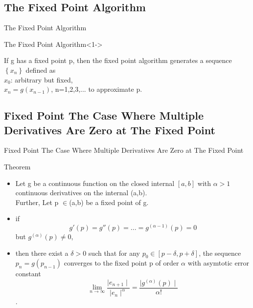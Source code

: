\documentclass{beamer}
\begin{document}
\subsection{The Fixed Point Algorithm}

\begin{frame}{The Fixed Point Algorithm}



\begin{block}{The Fixed Point Algorithm}<1->


If g has a fixed point p, then the fixed point algorithm generates a sequence $\left\{x_n\right\} $ defined as
\\$x_0$: arbitrary but fixed,
\\$x_n=g(x_{n-1})$, n=1,2,3,... to approximate p.
\end{block}

\end{frame}

\subsection{Fixed Point The Case Where Multiple Derivatives Are Zero at The Fixed Point}
\begin{frame}{Fixed Point The Case Where Multiple Derivatives Are Zero at The Fixed Point}
\begin{block}{Theorem}
\begin{itemize}

\item[]<1->Let g be a continuous function on the closed internal $[a,b]$ with $\alpha>1$ continuous derivatives on the internal (a,b). 
\\Further, Let p $\in $(a,b) be a fixed point of g. 
\item[]<2->if $$g'(p)=g''(p)=...=g^{(\alpha-1)}(p)=0$$ but $g^{(\alpha)}(p)\neq 0$, 

\item[]<3->then there exist a $\delta>0$ such that for any $p_0\in[p-\delta,p+\delta]$, the sequence $p_n=g(p_{n-1})$ converges to the fixed point p of order $\alpha$ with asymtotic error constant $$\lim_{n\to\infty}\frac{\mid e_{n+1}\mid}{\mid e_n\mid^\alpha}=\frac{\mid g^{(\alpha)}(p)\mid}{\alpha!}$$.

\end{itemize}
\end{block}
\end{frame}
\end{document}
